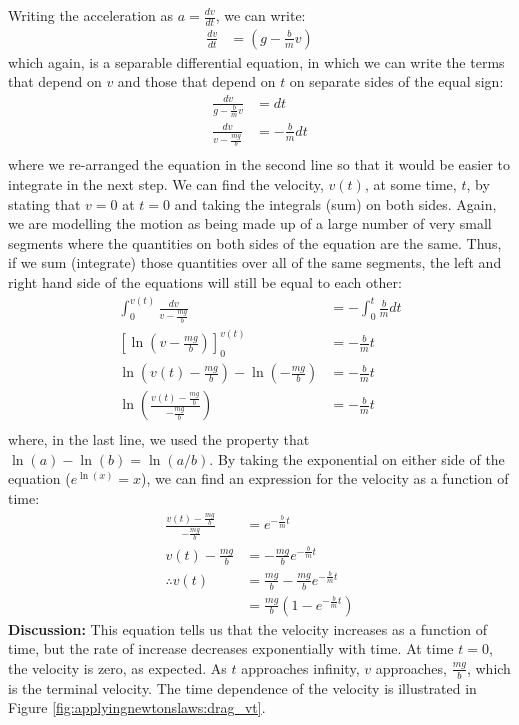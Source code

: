 \begin{example}
Writing the acceleration as $a=\frac{dv}{dt}$, we can write:
\begin{align*}
\frac{dv}{dt} &= \left(g-\frac{b}{m}v \right)
\end{align*}
which again, is a separable differential equation, in which we can write the terms that depend on $v$ and those that depend on $t$ on separate sides of the equal sign:
\begin{align*}
\frac{dv}{g-\frac{b}{m}v}&= dt\\
\frac{dv}{v-\frac{mg}{b}}&= -\frac{b}{m}dt\\
\end{align*}
where we re-arranged the equation in the second line so that it would be easier to integrate in the next step. We can find the velocity, $v(t)$, at some time, $t$, by stating that $v=0$ at $t=0$ and taking the integrals (sum) on both sides. Again, we are modelling the motion as being made up of a large number of very small segments where the quantities on both sides of the equation are the same. Thus, if we sum (integrate) those quantities over all of the same segments, the left and right hand side of the equations will still be equal to each other:
\begin{align*}
\int_0^{v(t)}\frac{dv}{v-\frac{mg}{b}} &= -\int_0^t\frac{b}{m} dt\\
\left[\ln\left(v-\frac{mg}{b} \right)\right]_0^{v(t)} &=-\frac{b}{m}t\\
\ln\left(v(t)-\frac{mg}{b} \right)-\ln\left(-\frac{mg}{b} \right)&=-\frac{b}{m}t\\
\ln\left( \frac{v(t)-\frac{mg}{b}}{-\frac{mg}{b}} \right)&=-\frac{b}{m}t\\
\end{align*}
where, in the last line, we used the property that $\ln(a)-\ln(b)=\ln(a/b)$. By taking the exponential on either side of the equation ($e^{\ln(x)}=x$), we can find an expression for the velocity as a function of time:
\begin{align*}
\frac{v(t)-\frac{mg}{b}}{-\frac{mg}{b}} &= e^{-\frac{b}{m}t}\\
v(t)-\frac{mg}{b} &= -\frac{mg}{b}e^{-\frac{b}{m}t}\\
\therefore v(t) &= \frac{mg}{b}-\frac{mg}{b}e^{-\frac{b}{m}t}\\
&=\frac{mg}{b}\left(1-e^{-\frac{b}{m}t}\right)
\end{align*}
\textbf{Discussion:} This equation tells us that the velocity increases as a function of time, but the rate of increase decreases exponentially with time. At time $t=0$, the velocity is zero, as expected. As $t$ approaches infinity, $v$ approaches, $\frac{mg}{b}$, which is the terminal velocity. The time dependence of the velocity is illustrated in Figure \ref{fig:applyingnewtonslaws:drag_vt}.


 
\end{example}

